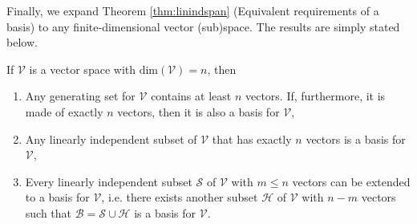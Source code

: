 Finally, we expand Theorem \ref{thm:linindspan} (Equivalent requirements of a basis) to any finite-dimensional vector (sub)space. The results are simply stated below.
\begin{proper}
\label{proper:linindspanbasisnewver}
If $\mathcal{V}$ is a vector space with $\text{dim}(\mathcal{V}) = n$, then
\begin{enumerate}[label=(\alph*)]
    \item Any generating set for $\mathcal{V}$ contains at least $n$ vectors. If, furthermore, it is made of exactly $n$ vectors, then it is also a basis for $\mathcal{V}$,
    \item Any linearly independent subset of $\mathcal{V}$ that has exactly $n$ vectors is a basis for $\mathcal{V}$,
    \item Every linearly independent subset $\mathcal{S}$ of $\mathcal{V}$ with $m \leq n$ vectors can be extended to a basis for $\mathcal{V}$, i.e. there exists another subset $\mathcal{H}$ of $\mathcal{V}$ with $n-m$ vectors such that $\mathcal{B} = \mathcal{S} \cup \mathcal{H}$ is a basis for $\mathcal{V}$.
\end{enumerate}
\end{proper}
